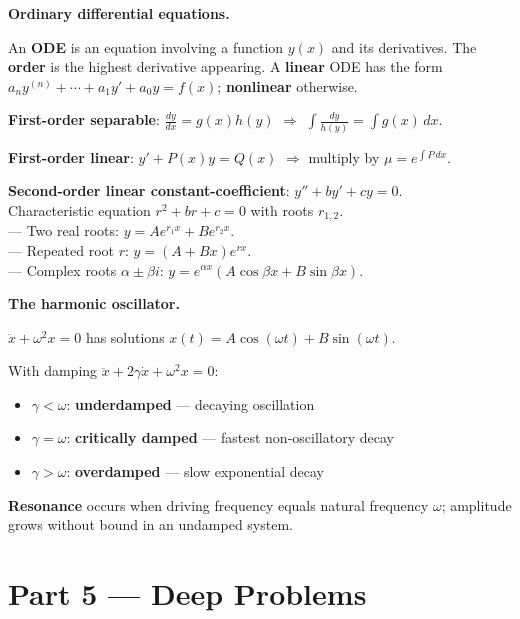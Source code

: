 \documentclass[12pt, a4paper]{article}
\begin{document}
\begin{namebox}
\textbf{Ordinary differential equations.}

An \textbf{ODE} is an equation involving a function $y(x)$ and its derivatives. The \textbf{order} is the highest derivative appearing. A \textbf{linear} ODE has the form $a_n y^{(n)} + \cdots + a_1 y' + a_0 y = f(x)$; \textbf{nonlinear} otherwise.

\medskip
\textbf{First-order separable}: $\frac{dy}{dx} = g(x)h(y)$ $\Rightarrow$ $\int\frac{dy}{h(y)} = \int g(x)\,dx$.

\textbf{First-order linear}: $y' + P(x)y = Q(x)$ $\Rightarrow$ multiply by $\mu = e^{\int P\,dx}$.

\textbf{Second-order linear constant-coefficient}: $y'' + by' + cy = 0$.\\
Characteristic equation $r^2 + br + c = 0$ with roots $r_{1,2}$.\\
--- Two real roots: $y = Ae^{r_1 x} + Be^{r_2 x}$.\\
--- Repeated root $r$: $y = (A+Bx)e^{rx}$.\\
--- Complex roots $\alpha\pm\beta i$: $y = e^{\alpha x}(A\cos\beta x + B\sin\beta x)$.
\end{namebox}

\begin{namebox}
\textbf{The harmonic oscillator.}

$\ddot{x} + \omega^2 x = 0$ has solutions $x(t) = A\cos(\omega t) + B\sin(\omega t)$.

With damping $\ddot{x} + 2\gamma\dot{x} + \omega^2 x = 0$:
\begin{itemize}[noitemsep, topsep=4pt]
  \item $\gamma < \omega$: \textbf{underdamped} --- decaying oscillation
  \item $\gamma = \omega$: \textbf{critically damped} --- fastest non-oscillatory decay
  \item $\gamma > \omega$: \textbf{overdamped} --- slow exponential decay
\end{itemize}
\textbf{Resonance} occurs when driving frequency equals natural frequency $\omega$; amplitude grows without bound in an undamped system.
\end{namebox}

\section{Part 5 \texorpdfstring{---}{--} Deep Problems}
\end{document}
